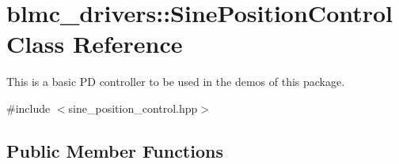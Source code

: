 \hypertarget{classblmc__drivers_1_1SinePositionControl}{}\section{blmc\+\_\+drivers\+:\+:Sine\+Position\+Control Class Reference}
\label{classblmc__drivers_1_1SinePositionControl}


This is a basic PD controller to be used in the demos of this package.  




{\ttfamily \#include $<$sine\+\_\+position\+\_\+control.\+hpp$>$}

\subsection*{Public Member Functions}
